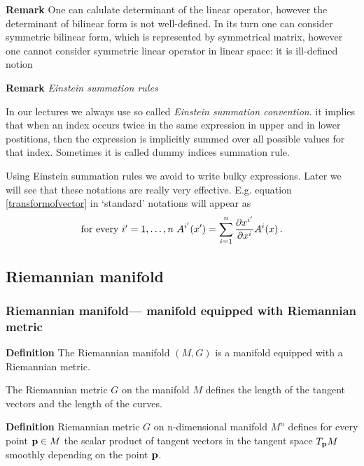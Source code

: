 \documentclass[12pt]{article}
\theoremstyle{theorem}
\numberwithin{equation}{section}
\begin{document}
 
			  {\footnotesize	
			  {\bf Remark}
One can  calulate determinant of the linear operator, however
the determinant of bilinear form is not well-defined.
In its turn one can consider symmetric bilinear form, which is 
represented by symmetrical matrix, however one cannot consider
symmetric linear operator in linear space: it is ill-defined notion}







{\bf Remark} {\it Einstein  summation rules}


 In our lectures we always use so called {\it Einstein summation convention}.
 it  implies that when an index occurs twice
in the same expression in upper and in lower postitions, then
 the expression is implicitly summed over all possible values
for that index.
  Sometimes it is called dummy indices summation rule.
 

   Using Einstein summation rules we avoid to write
bulky expressions. 
Later we will see that these notations are really very effective.
E.g. equation \eqref{transformofvector}
in `standard' notations will appear as
         $$
  \hbox {for every $i'=1,\dots,n$}\,\,
A^{i'}(x')=\sum_{i=1}^n{\partial x^{i'}\over \partial x^i}A^i(x)\,.
         $$ 

\subsection {Riemannian manifold}




    \subsubsection {Riemannian manifold---
manifold equipped with Riemannian metric}\label{riemmetricdef}

{\bf Definition} The Riemannian manifold $(M,G)$ is a
manifold equipped with a Riemannian metric.



  The Riemannian metric $G$ on the manifold $M$ defines the
  length of the tangent vectors and the length of the curves.

{\bf Definition}
  Riemannian metric $G$ on n-dimensional manifold $M^n$
  defines for every point ${\bf p}\in M$ the scalar product
  of tangent vectors in the tangent space $T_{\bf p} M$
  smoothly depending on the point ${\bf p} $.
\end{document}
